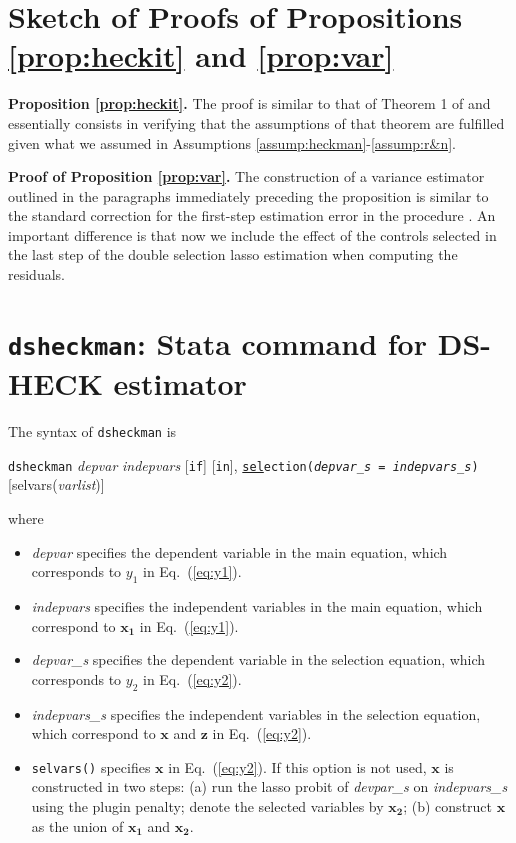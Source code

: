 \documentclass[11pt]{article}
\begin{document}
\section{Sketch of Proofs of Propositions \ref{prop:heckit} and \ref{prop:var} }\label{sec:proofs}

\textbf{Proposition \ref{prop:heckit}.} The proof is similar to that of Theorem 1 of \cite{bellonichernozhukovhansen2014} and essentially consists in verifying that the assumptions of that theorem are fulfilled given what we assumed in Assumptions 
 \ref{assump:heckman}-\ref{assump:r&n}. 

\textbf{Proof of Proposition \ref{prop:var}.} The construction of a variance estimator outlined in the paragraphs immediately preceding the proposition is similar to the standard correction for the first-step estimation error in the \citet{Heckman1979} procedure \cite[see, e.g.,][Section 16.10.2]{cameron/trivedi:05}. An important difference is that now we include the effect of the controls selected in the last step of the double selection lasso estimation when computing the residuals. 


\section{{\tt dsheckman}: Stata command for DS-HECK estimator}
\label{sec:dsheckman_syntax}

The syntax of {\tt dsheckman} is 

{\tt dsheckman} {\it depvar} {\it indepvars} [{\tt if}] [{\tt in}], 
	{\tt \underline{sel}ection({\it depvar\_s} = {\it indepvars\_s})}
	[selvars({\it varlist})]

\noindent
where 
\begin{itemize}
\item {\it depvar} specifies the dependent variable in the main equation, which
corresponds to $y_1$ in Eq.~(\ref{eq:y1}).

\item {\it indepvars} specifies the independent variables in the main equation,
which correspond to $\mathbf{x_1}$ in Eq.~(\ref{eq:y1}).

\item {\it depvar\_s} specifies the dependent variable in the selection
equation, which corresponds to $y_2$ in Eq.~(\ref{eq:y2}).

\item {\it indepvars\_s} specifies the independent variables in the selection
equation, which correspond to $\mathbf{x}$ and $\mathbf{z}$ in
Eq.~(\ref{eq:y2}).

\item {\tt selvars()} specifies $\mathbf{x}$ in Eq.~(\ref{eq:y2}). If this
option is not used, $\mathbf{x}$ is constructed in two steps: (a) run the
lasso probit of {\it devpar\_s} on {\it indepvars\_s} using the plugin penalty; denote the selected variables by $\mathbf{x_2}$; (b) construct $\mathbf{x}$ as the
union of $\mathbf{x_1}$ and $\mathbf{x_2}$.

\end{itemize}

\newpage


\end{document}
